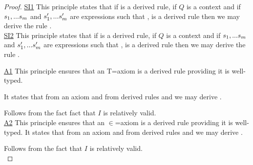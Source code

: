 \begin{proof}
\underline{SI1} 
This principle states that if  is a derived rule, if $Q$ is a context and if  $s_1,...s_m$ and $s'_1,...s'_m$ are expressions such that
\foreachj,  is a derived rule then we may derive the rule
. \\
\vspace{1cm}
\underline{SI2} 
This principle states that if  is a derived rule, if $Q$ is a context and if  $s_1,...s_m$ and $s'_1,...s'_m$ are expressions such that
\foreachj,  is a derived rule then we may derive the rule
. \\
\vspace{1cm}

\underline{A1} 
This principle ensures that an T=axiom is a derived rule providing it is well-typed.
 
It states that from an axiom  and from derived rules
  and  we may derive
.


\vspace{1cm}
Follows from the fact fact that $I$ is relatively valid.\\

\underline{A2} 
This principle ensures that an $\in$=axiom is a derived rule providing it is well-typed.
It states that from an axiom  and from derived rules
  and  we may derive
.

\vspace{1cm}
Follows from the fact that $I$ is relatively valid. \\

\end{proof}

